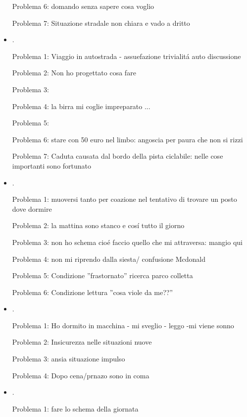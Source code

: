 \begin{itemize}
Problema 6: domando senza sapere cosa voglio

Problema 7: Situazione stradale non chiara e vado a dritto


\item {}.

Problema 1: Viaggio in autostrada - assuefazione trivialit\'a auto discussione

Problema 2: Non ho progettato cosa fare

Problema 3: 

Problema 4: la birra mi coglie impreparato ...

Problema 5: 

Problema 6: stare con 50 euro nel limbo: angoscia per paura che non si rizzi

Problema 7: Caduta causata dal bordo della pista ciclabile: nelle cose importanti sono fortunato

\item {}.

Problema 1: muoversi tanto per coazione nel tentativo di trovare un posto dove dormire

Problema 2: la mattina sono stanco e cos\'i tutto il giorno

Problema 3: non ho schema cio\'e faccio quello che mi attraversa: mangio qui

Problema 4: non mi riprendo dalla siesta/ confusione Mcdonald

Problema 5: Condizione ''frastornato'' ricerca parco colletta

Problema 6: Condizione lettura ''cosa viole da me??''

\item {}.

Problema 1: Ho dormito in macchina - mi sveglio - leggo -mi viene sonno

Problema 2: Insicurezza nelle situazioni nuove

Problema 3: ansia situazione impulso

Problema 4: Dopo cena/prnazo sono in coma

\item {}.

Problema 1: fare lo schema della giornata


\end{itemize}

